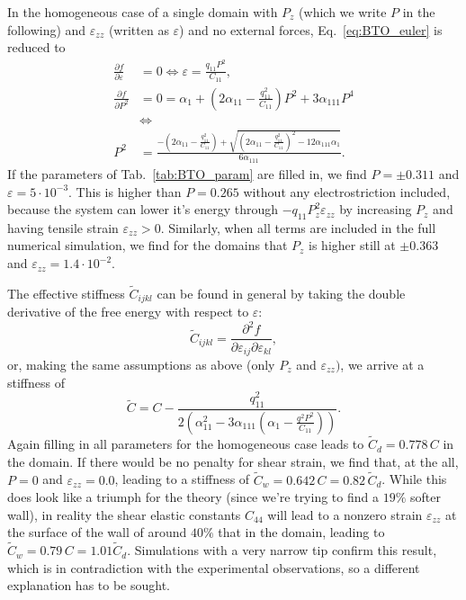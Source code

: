 In the homogeneous case of a single domain with $P_z$ (which we write $P$ in the following) and $\varepsilon_{zz}$ (written as $\varepsilon$) and no external forces, Eq.~\ref{eq:BTO_euler} is reduced to  
\begin{align}
	\frac{\partial f}{\partial \varepsilon} &= 0 \Leftrightarrow \varepsilon = \frac{q_{11}P^2}{C_{11}}\label{eq:BTO_e0},\\
	\frac{\partial f}{\partial P^2} &= 0 = \alpha_1 + (2 \alpha_{11} - \frac{q_{11}^2}{C_{11}})P^2 + 3\alpha_{111}P^4 \\
	& \Leftrightarrow \\
	P^2 &= \frac{-(2\alpha_{11} - \frac{q_{11}^2}{C_{11}}) + \sqrt{(2\alpha_{11}-\frac{q_{11}^2}{C_{11}})^2 - 12 \alpha_{111} \alpha_1}}{6\alpha_{111}}.
\end{align}
If the parameters of Tab.~\ref{tab:BTO_param} are filled in, we find $P = \pm 0.311$ and $\varepsilon = 5 \cdot 10^{-3}$.
This is higher than $P = 0.265$ \cite{Marton2010} without any electrostriction included, because the system can lower it's energy through $-q_{11}P_z^2\varepsilon_{zz}$ by increasing $P_z$ and having tensile strain $\varepsilon_{zz} > 0$.
Similarly, when all terms are included in the full numerical simulation, we find for the domains that $P_z$ is higher still at $\pm 0.363$ and $\varepsilon_{zz} = 1.4 \cdot 10^{-2}$.

The effective stiffness $\tilde{C}_{ijkl}$ can be found in general by taking the double derivative of the free energy with respect to $\varepsilon$:
\begin{equation}
	\tilde{C}_{ijkl} = \frac{\partial^2 f}{\partial \varepsilon_{ij} \partial \varepsilon_{kl}},
\end{equation}
or, making the same assumptions as above (only $P_z$ and $\varepsilon_{zz})$, we arrive at a stiffness of
\begin{equation}
	\tilde{C} = C - \frac{q_{11}^2}{2\left(\alpha_{11}^2 - 3 \alpha_{111}\left(\alpha_1  - \frac{q^2 P^2}{C_{11}}\right)\right)}\label{eq:BTO_domainC}.
\end{equation}
Again filling in all parameters for the homogeneous case leads to $\tilde{C}_d = 0.778 \,C$ in the domain.
If there would be no penalty for shear strain, we find that, at the all, $P = 0$ and $\varepsilon_{zz} = 0.0$, leading to a stiffness of $\tilde{C}_w = 0.642 \, C = 0.82\, \tilde{C}_d$.
While this does look like a triumph for the theory (since we're trying to find a $19\%$ softer wall), in reality the shear elastic constants $C_{44}$  will lead to a nonzero strain $\varepsilon_{zz}$ at the surface of the wall of around $40\%$ that in the domain, leading to $\tilde{C}_w = 0.79 \, C = 1.01 \tilde{C}_d$.
Simulations with a very narrow tip confirm this result, which is in contradiction with the experimental observations, so a different explanation has to be sought.

